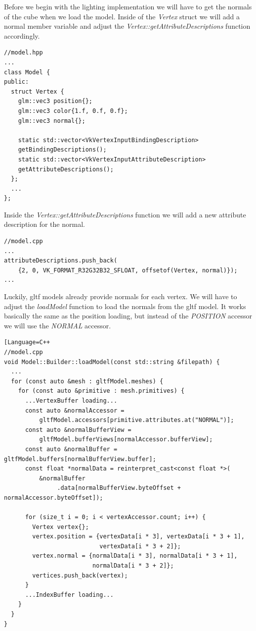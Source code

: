 \documentclass[12pt]{report} \usepackage{preamble}
\begin{document}
Before we begin with the lighting implementation we will have to get the normals of the cube when we load the model.
Inside of the \textit{Vertex} struct we will add a normal member variable and adjust the \textit{Vertex::getAttributeDescriptions} function accordingly.

\begin{lstlisting}[Language=C++]
//model.hpp
...
class Model {
public:
  struct Vertex {
    glm::vec3 position{};
    glm::vec3 color{1.f, 0.f, 0.f};
    glm::vec3 normal{};

    static std::vector<VkVertexInputBindingDescription>
    getBindingDescriptions();
    static std::vector<VkVertexInputAttributeDescription>
    getAttributeDescriptions();
  };
  ...
};
\end{lstlisting}

Inside the \textit{Vertex::getAttributeDescriptions} function we will add a new attribute description for the normal.

\begin{lstlisting}[Language=C++]
//model.cpp
...
attributeDescriptions.push_back(
    {2, 0, VK_FORMAT_R32G32B32_SFLOAT, offsetof(Vertex, normal)});
...
\end{lstlisting}

Luckily, gltf models already provide normals for each vertex. We will have to adjust the \textit{loadModel} function to load the normals from the gltf model.
It works basically the same as the position loading, but instead of the \textit{POSITION} accessor we will use the \textit{NORMAL} accessor.

\begin{lstlisting}[Language=C++
//model.cpp
void Model::Builder::loadModel(const std::string &filepath) {
  ...
  for (const auto &mesh : gltfModel.meshes) {
    for (const auto &primitive : mesh.primitives) {
      ...VertexBuffer loading...
      const auto &normalAccessor =
          gltfModel.accessors[primitive.attributes.at("NORMAL")];
      const auto &normalBufferView =
          gltfModel.bufferViews[normalAccessor.bufferView];
      const auto &normalBuffer = gltfModel.buffers[normalBufferView.buffer];
      const float *normalData = reinterpret_cast<const float *>(
          &normalBuffer
               .data[normalBufferView.byteOffset + normalAccessor.byteOffset]);

      for (size_t i = 0; i < vertexAccessor.count; i++) {
        Vertex vertex{};
        vertex.position = {vertexData[i * 3], vertexData[i * 3 + 1],
                           vertexData[i * 3 + 2]};
        vertex.normal = {normalData[i * 3], normalData[i * 3 + 1],
                         normalData[i * 3 + 2]};
        vertices.push_back(vertex);
      }
      ...IndexBuffer loading...
    }
  }
}
\end{lstlisting}
\end{document}
